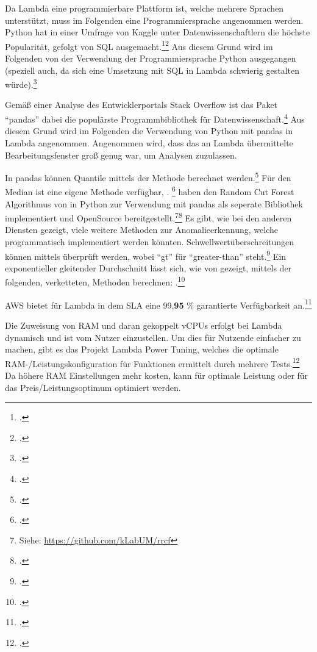 \label{anhang:vergleich-lambda}
Da Lambda eine programmierbare Plattform ist, welche mehrere Sprachen unterstützt, muss im Folgenden eine Programmiersprache angenommen werden. Python hat in einer Umfrage von Kaggle unter Datenwissenschaftlern die höchste Popularität, gefolgt von \ac{SQL} ausgemacht.\footcite[Vgl.][]{KaggleInc..2019}\nzitat\footcite[Vgl.][]{Hayes.2020} Aus diesem Grund wird im Folgenden von der Verwendung der Programmiersprache Python ausgegangen (speziell auch, da sich eine Umsetzung mit \ac{SQL} in Lambda schwierig gestalten würde).\footcite[Vgl.][]{Hayes.2020} 

Gemäß einer Analyse des Entwicklerportals Stack Overflow ist das Paket \enquote{pandas} dabei die populärste Programmbibliothek für Datenwissenschaft.\footcite[Vgl.][]{Robinson.2017} Aus diesem Grund wird im Folgenden die Verwendung von Python mit pandas in Lambda angenommen. Angenommen wird, dass das an Lambda übermittelte Bearbeitungsfenster groß genug war, um Analysen zuzulassen.

In pandas können Quantile mittels der  Methode berechnet werden.\footcite[Vgl.][]{o.V..o.J.c} Für den Median ist eine eigene Methode verfügbar, . \footcite[Vgl.][]{o.V..o.J.d}
\citeauthor{Bartos.2019} haben den Random Cut Forest Algorithmus von \citeauthor{Guha.2016} in Python zur Verwendung mit pandas als seperate Bibliothek implementiert und OpenSource bereitgestellt.\footnote{Siehe: \url{https://github.com/kLabUM/rrcf}}\nzitat\footcite[Vgl.][]{Bartos.2019} Es gibt, wie bei den anderen Diensten gezeigt, viele weitere Methoden zur Anomalieerkennung, welche programmatisch implementiert werden könnten.
Schwellwertüberschreitungen können mittels  überprüft werden, wobei \enquote{gt} für \enquote{greater-than} steht.\footcite[Vgl.][]{o.V..o.J.e}
Ein exponentieller gleitender Durchschnitt lässt sich, wie von \citeauthor{Sharma.2019} gezeigt, mittels der folgenden, verketteten, Methoden berechnen: .\footcite[Vgl.][]{Sharma.2019} 

\ac{AWS} bietet für Lambda in dem \ac{SLA} eine 99,\textbf{95} \% garantierte Verfügbarkeit an.\footcite[Vgl.][]{AmazonWebServicesInc..2019d}

Die Zuweisung von \ac{RAM} und daran gekoppelt vCPUs erfolgt bei Lambda dynamisch und ist vom Nutzer einzustellen. Um dies für Nutzende einfacher zu machen, gibt es das Projekt Lambda Power Tuning, welches die optimale \ac{RAM}-/Leistungskonfiguration für Funktionen ermittelt durch mehrere Tests.\footcite[Vgl. auch im Folgenden][]{AmazonWebServicesInc..o.J.at} Da höhere \ac{RAM} Einstellungen mehr kosten, kann für optimale Leistung oder für das Preis/Leistungsoptimum optimiert werden.


